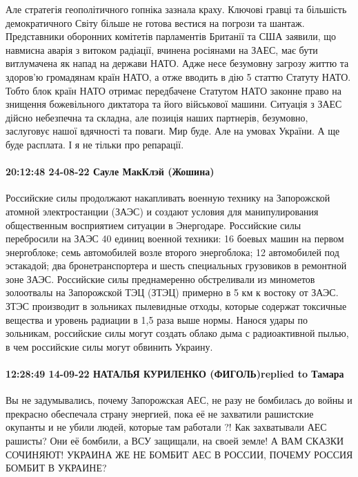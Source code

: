 Але стратегія геополітичного гопніка зазнала краху.
Ключові гравці та більшість демократичного Світу більше не готова вестися на погрози та шантаж.
Представники оборонних комітетів парламентів Британії та США заявили, що навмисна аварія з витоком радіації, вчинена росіянами на ЗАЕС, має бути витлумачена як напад на держави НАТО.
Адже несе безумовну загрозу життю та здоров’ю громадянам країн НАТО, а отже вводить в дію 5 статтю Статуту НАТО.
Тобто блок країн НАТО отримає передбачене Статутом НАТО законне право на знищення божевільного диктатора та його військової машини.
Ситуація з ЗАЕС дійсно небезпечна та складна, але позиція наших партнерів, безумовно, заслуговує нашої вдячності та поваги.
Мир буде. Але на умовах України.
А ще буде расплата. І я не тільки про репарації.

\paragraph{20:12:48 24-08-22 Сауле МакКлэй (Жошина)}

Российские силы продолжают накапливать военную технику на Запорожской атомной
электростанции (ЗАЭС) и создают условия для манипулирования общественным
восприятием ситуации в Энергодаре. Российские силы перебросили на ЗАЭС 40
единиц военной техники: 16 боевых машин на первом энергоблоке; семь автомобилей
возле второго энергоблока; 12 автомобилей под эстакадой; два бронетранспортера
и шесть специальных грузовиков в ремонтной зоне ЗАЭС. Российские силы
преднамеренно обстреливали из минометов золоотвалы на Запорожской ТЭЦ (ЗТЭЦ)
примерно в 5 км к востоку от ЗАЭС. ЗТЭС производит в зольниках пылевидные
отходы, которые содержат токсичные вещества и уровень радиации в 1,5 раза выше
нормы. Нанося удары по зольникам, российские силы могут создать облако дыма с
радиоактивной пылью, в чем российские силы могут обвинить Украину.

\paragraph{12:28:49 14-09-22 НАТАЛЬЯ КУРИЛЕНКО (ФИГОЛЬ)replied to Тамара}

Вы не задумывались, почему Запорожская АЕС, не разу не бомбилась до войны и прекрасно обеспечала страну энергией, пока её не захватили рашистские окупанты и не убили людей, которые там работали ?!
Как захватывали АЕС рашисты? Они её бомбили, а ВСУ защищали, на своей земле!
А ВАМ СКАЗКИ СОЧИНЯЮТ!
УКРАИНА ЖЕ НЕ БОМБИТ АЕС В РОССИИ, ПОЧЕМУ РОССИЯ БОМБИТ В УКРАИНЕ?
